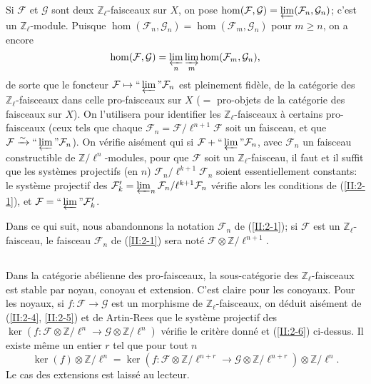 \documentclass{book}
\newcommand{\cF}{\mathcal{F}}
\newcommand{\cG}{\mathcal{G}}
\newcommand{\dZ}{\mathbb{Z}}
\newcommand{\iso}{\xrightarrow\sim}
\begin{document}
Si $\cF$ et $\cG$ sont deux $\dZ_\ell$-faisceaux sur $X$, on pose 
$\hom(\cF,\cG) = \varprojlim(\cF_n,\cG_n)$; c'est un $\dZ_\ell$-module. 
Puisque $\hom(\cF_n,\cG_n) = \hom(\cF_m,\cG_n)$ pour $m\geqslant n$, on a 
encore 
\[
  \hom(\cF,\cG) = \varprojlim_n \varinjlim_m \hom(\cF_m,\cG_n) \text{,}
\]
de sorte que le foncteur $\cF\mapsto \text{``}\varprojlim\text{''}\cF_n$ est 
pleinement fidèle, de la catégorie des $\dZ_\ell$-faisceaux dans celle 
pro-faisceaux sur $X$ ($=$ pro-objets de la catégorie des faisceaux sur $X$). 
On l'utilisera pour identifier les $\dZ_\ell$-faisceaux à certains 
pro-faisceaux (ceux tels que chaque $\cF_n=\cF/\ell^{n+1}\cF$ soit un faisceau, 
et que $\cF\iso \text{``}\varprojlim\text{''}\cF_n$). On vérifie aisément 
qui si $\cF+\text{``}\varprojlim\text{''}\cF_n$, avec $\cF_n$ un faisceau 
constructible de $\dZ/\ell^n$-modules, pour que $\cF$ soit un 
$\dZ_\ell$-faisceau, il faut et il suffit que les systèmes projectifs (en $n$) 
$\cF_n/\ell^{k+1}\cF_n$ soient essentiellement constants: le système 
projectif des $\cF_k'=\varprojlim_n\cF_n/\ell^{k+1}\cF_n$ vérifie alors les 
conditions de (\ref{II:2-1}), et $\cF=\text{``}\varprojlim\text{''}\cF_k'$. 

Dans ce qui suit, nous abandonnons la notation $\cF_n$ de (\ref{II:2-1}); si 
$\cF$ est un $\dZ_\ell$-faisceau, le faisceau $\cF_n$ de (\ref{II:2-1}) sera 
noté $\cF\otimes\dZ/\ell^{n+1}$. 





\subsection{}\label{II:2-7}

Dans la catégorie abélienne des pro-faisceaux, la sous-catégorie des 
$\dZ_\ell$-faisceaux est stable par noyau, conoyau et extension. C'est claire 
pour les conoyaux. Pour les noyaux, si $f:\cF\to\cG$ est un morphisme de 
$\dZ_\ell$-faisceaux, on déduit aisément de (\ref{II:2-4}, \ref{II:2-5}) 
et de Artin-Rees que le système projectif des 
$\ker(f:\cF\otimes\dZ/\ell^n\to\cG\otimes\dZ/\ell^n)$ vérifie le critère 
donné et (\ref{II:2-6}) ci-dessus. Il existe même un entier $r$ tel que pour 
tout $n$ 
\[
  \ker(f)\otimes\dZ/\ell^n = \ker(f:\cF\otimes\dZ/\ell^{n+r}\to\cG\otimes\dZ/\ell^{n+r})\otimes\dZ/\ell^n \text{.}
\]
Le cas des extensions est laissé au lecteur. 





\subsection{}\label{II:2-8}
\end{document}
